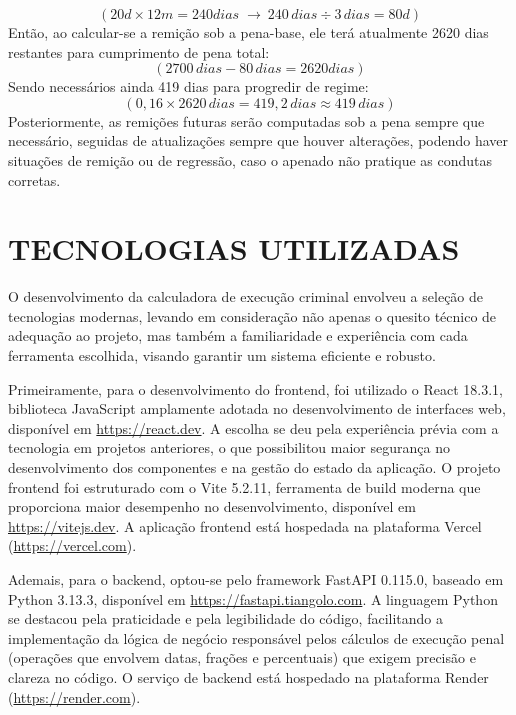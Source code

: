 \begin{equation*}
(20d \times 12m = 240 dias \;\rightarrow\ 240\,dias \div 3\,dias = 80d)
\end{equation*}
Então, ao calcular-se a remição sob a pena-base, ele terá atualmente 2620 dias restantes para cumprimento de pena total:
\begin{equation*}
(2700\,dias - 80\,dias = 2620dias)
\end{equation*}
Sendo necessários ainda 419 dias para progredir de regime:
\begin{equation*}
(0{,}16 \times 2620\,dias = 419{,}2\,dias \approx 419\,dias)
\end{equation*}
Posteriormente, as remições futuras serão computadas sob a pena sempre que necessário, seguidas de atualizações sempre que houver alterações, podendo haver situações de remição ou de regressão, caso o apenado não pratique as condutas corretas.

\section{TECNOLOGIAS UTILIZADAS}

O desenvolvimento da calculadora de execução criminal envolveu a seleção de tecnologias modernas, levando em consideração não apenas o quesito técnico de adequação ao projeto, mas também a familiaridade e experiência com cada ferramenta escolhida, visando garantir um sistema eficiente e robusto.

Primeiramente, para o desenvolvimento do frontend, foi utilizado o React 18.3.1\cite{react}, biblioteca JavaScript amplamente adotada no desenvolvimento de interfaces web, disponível em \url{https://react.dev}. A escolha se deu pela experiência prévia com a tecnologia em projetos anteriores, o que possibilitou maior segurança no desenvolvimento dos componentes e na gestão do estado da aplicação. O projeto frontend foi estruturado com o Vite 5.2.11\cite{vite}, ferramenta de build moderna que proporciona maior desempenho no desenvolvimento, disponível em \url{https://vitejs.dev}. A aplicação frontend está hospedada na plataforma Vercel\cite{vercel} (\url{https://vercel.com}).

Ademais, para o backend, optou-se pelo framework FastAPI 
0.115.0\cite{fastapi}, baseado em Python 3.13.3, disponível em \url{https://fastapi.tiangolo.com}. A linguagem Python se destacou pela praticidade e pela legibilidade do código, facilitando a implementação da lógica de negócio responsável pelos cálculos de execução penal (operações que envolvem datas, frações e percentuais) que exigem precisão e clareza no código. O serviço de backend está hospedado na plataforma Render\cite{render} (\url{https://render.com}).

